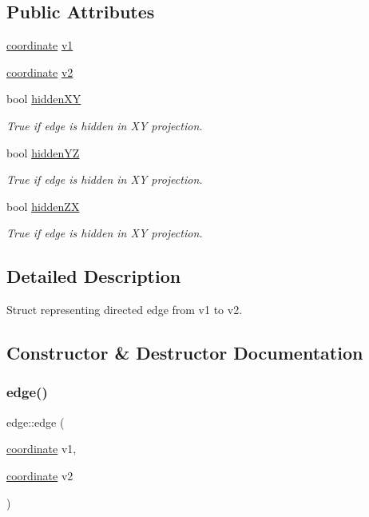 \subsection*{Public Attributes}
\begin{DoxyCompactItemize}
\item 
\mbox{\hyperlink{structcoordinate}{coordinate}} \mbox{\hyperlink{structedge_aa0be03a8ab19817782042e48a727c146}{v1}}
\item 
\mbox{\hyperlink{structcoordinate}{coordinate}} \mbox{\hyperlink{structedge_a0d40d224ece0488b6a506ab842f0fa41}{v2}}
\item 
bool \mbox{\hyperlink{structedge_ac9518793ccbfc62888d64752dd05fcba}{hidden\+XY}}
\begin{DoxyCompactList}\small\item\em True if edge is hidden in XY projection. \end{DoxyCompactList}\item 
bool \mbox{\hyperlink{structedge_ae634f0360e0a0cfca2cd9491ad327029}{hidden\+YZ}}
\begin{DoxyCompactList}\small\item\em True if edge is hidden in XY projection. \end{DoxyCompactList}\item 
bool \mbox{\hyperlink{structedge_a5942b501b10c47fe01f669aaf1f2763e}{hidden\+ZX}}
\begin{DoxyCompactList}\small\item\em True if edge is hidden in XY projection. \end{DoxyCompactList}\end{DoxyCompactItemize}


\subsection{Detailed Description}
Struct representing directed edge from v1 to v2. 

\subsection{Constructor \& Destructor Documentation}
\mbox{\label{structedge_aabfb062b5ca49e6cc13a40b3670665b6}} 
\subsubsection{\texorpdfstring{edge()}{edge()}\hspace{0.1cm}{\footnotesize\ttfamily [1/2]}}
{\footnotesize\ttfamily edge\+::edge (\begin{DoxyParamCaption}\item[{\mbox{\hyperlink{structcoordinate}{coordinate}}}]{v1,  }\item[{\mbox{\hyperlink{structcoordinate}{coordinate}}}]{v2 }\end{DoxyParamCaption})}



